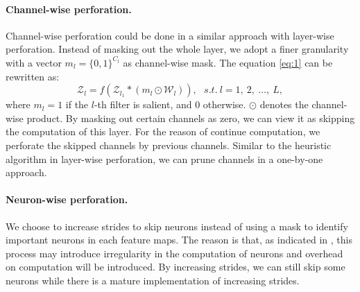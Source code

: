 \documentclass[pageno]{jpaper}
\begin{document}
\paragraph{Channel-wise perforation.} Channel-wise perforation could be done in a similar approach with layer-wise perforation. Instead of masking out the whole layer, we adopt a finer granularity with a vector $m_l = \{0,1\}^{C_l}$ as channel-wise mask. The equation \ref{eq:1} can be rewritten as:
\begin{equation} \label{eq: 3}
    \mathcal{Z}_l = f(\mathcal{Z}_{l_1} \ast (m_l \odot \mathcal{W}_l) ), \ \ \  s.t. \: l = 1,\: 2, \: \dots, \: L,
\end{equation}
where $m_l = 1$ if the $l$-th filter is salient, and $0$ otherwise. $\odot$ denotes the channel-wise product. By masking out certain channels as zero, we can view it as skipping the computation of this layer. For the reason of continue computation, we perforate the skipped channels by previous channels. Similar to the heuristic algorithm in layer-wise perforation, we can prune channels in a one-by-one approach.

\paragraph{Neuron-wise perforation.} We choose to increase strides to skip neurons instead of using a mask to identify important neurons in each feature maps. The reason is that, as indicated in \cite{aklaghi2018snapea, buckler2018eva, hegde2018ucnn}, this process may introduce irregularity in the computation of neurons and overhead on computation will be introduced. By increasing strides, we can still skip some neurons while there is a mature implementation of increasing strides.

\end{document}
